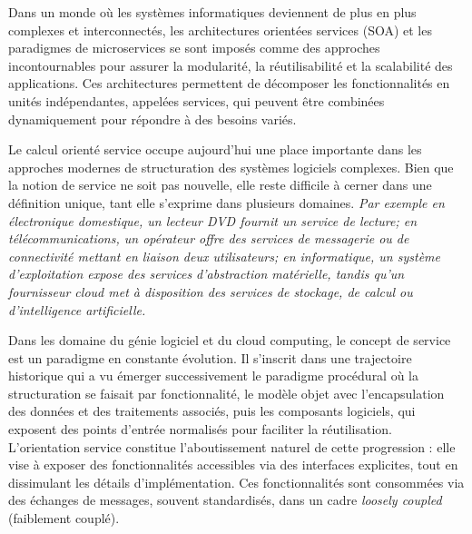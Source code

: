 \label{chap:services_composition_generalities}




Dans un monde où les systèmes informatiques deviennent de plus en plus complexes et interconnectés, les architectures orientées services (SOA) \cite{papazoglou2007service} et les paradigmes de microservices se sont imposés comme des approches incontournables pour assurer la modularité, la réutilisabilité et la scalabilité des applications. Ces architectures permettent de décomposer les fonctionnalités en unités indépendantes, appelées services, qui peuvent être combinées dynamiquement pour répondre à des besoins variés.

Le calcul orienté service occupe aujourd’hui une place importante dans les approches modernes de structuration des systèmes logiciels complexes. Bien que la notion de service ne soit pas nouvelle, elle reste difficile à cerner dans une définition unique, tant elle s’exprime dans plusieurs domaines. \textit{Par exemple en électronique domestique, un lecteur DVD fournit un service de lecture; en télécommunications, un opérateur offre des services de messagerie ou de connectivité mettant en liaison deux utilisateurs; en informatique, un système d’exploitation expose des services d’abstraction matérielle, tandis qu’un fournisseur cloud met à disposition des services de stockage, de calcul ou d’intelligence artificielle.}

Dans les domaine du génie logiciel et du cloud computing, le concept de service est un paradigme en constante évolution. Il s’inscrit dans une trajectoire historique qui a vu émerger successivement le paradigme procédural où la structuration se faisait par fonctionnalité, le modèle objet avec l'encapsulation des données et des traitements associés, puis les composants logiciels, qui exposent des points d’entrée normalisés pour faciliter la réutilisation. L’orientation service constitue l’aboutissement naturel de cette progression : elle vise à exposer des fonctionnalités accessibles via des interfaces explicites, tout en dissimulant les détails d’implémentation. Ces fonctionnalités sont consommées via des échanges de messages, souvent standardisés, dans un cadre \textit{loosely coupled} \cite{papazoglou2007service} (faiblement couplé).

